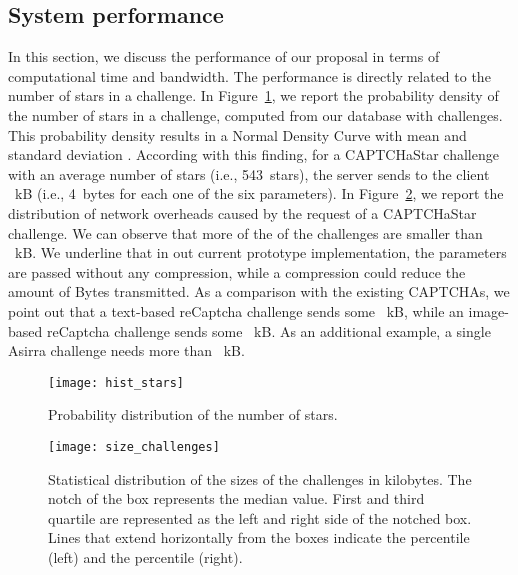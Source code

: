 \documentclass[conference]{IEEEtran}
\newcommand{\hilight}[1]{#1}
\begin{document}
\subsection{System performance}
\hilight{In this section, we discuss the performance of our proposal in terms of computational time and bandwidth.
The performance is directly related to the number of stars in a challenge.}
In Figure~\ref{fig:histGeneration}, \hilight{we report the probability density of the number of stars in a challenge, computed from our database with  challenges.
This probability density results in a Normal Density Curve with mean  and standard deviation .}
According with this finding, for a CAPTCHaStar challenge with an average number of stars (i.e., 543~stars), the server sends to the client ~kB (i.e., 4~bytes for each one of the six parameters).
In Figure~\ref{fig:sizeChallenge}, we report the distribution of network overheads caused by the request of a CAPTCHaStar challenge. 
We can observe that more of the  of the challenges are smaller than ~kB.
\hilight{We underline that in out current prototype implementation, the parameters are passed without any compression, while a compression could reduce the amount of Bytes transmitted.
As a comparison with the existing CAPTCHAs, we point out that a text-based reCaptcha challenge sends some ~kB, while an image-based reCaptcha challenge sends some ~kB. 
As an additional example, a single Asirra challenge needs more than ~kB.}

\begin{figure}[ht]\centering
\texttt{[image: hist\_stars]}
\caption{Probability distribution of the number of stars.}
\label{fig:histGeneration}
\end{figure}

\begin{figure}[ht]\centering
\texttt{[image: size\_challenges]}
\caption{Statistical distribution of the sizes of the challenges in kilobytes. The
notch of the box represents the median value. First and third quartile
are represented as the left and right side of the notched box.  
Lines that extend horizontally from the boxes indicate the  percentile (left) and
the  percentile (right).}
\label{fig:sizeChallenge}
\end{figure}
\end{document}
